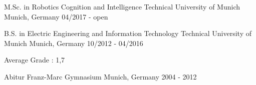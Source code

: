 \begin{cventries}
    \cventry
    {M.Sc. in Robotics Cognition and Intelligence} %
    {Technical University of Munich} %
    {Munich, Germany} %
    {04/2017 - open} %
    {}
    
    \cventry
    {B.S. in Electric Engineering and Information Technology} %
    {Technical University of Munich} %
    {Munich, Germany} %
    {10/2012 - 04/2016} %
    {
        \begin{cvitems} %
        \item {Average Grade : 1,7}
        \end{cvitems}
    }

    \cventry
    {Abitur} %
    {Franz-Marc Gymnasium} %
    {Munich, Germany} %
    {2004 - 2012} %
    {}
\end{cventries}
